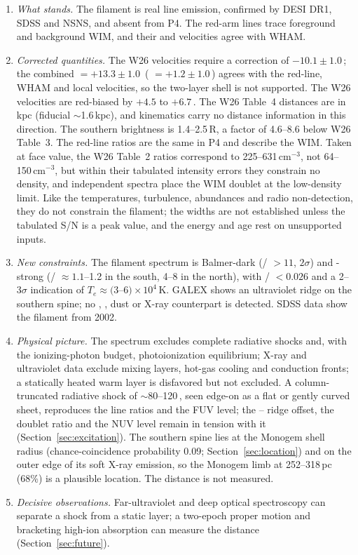 \begin{enumerate}
\item \textit{What stands.} The \Oiii{} filament is real line emission, confirmed by DESI DR1, SDSS and NSNS, and absent from P4. The red-arm lines trace foreground and background WIM, and their \Nii{} and \Sii{} velocities agree with WHAM.

\item \textit{Corrected quantities.} The W26 \Oiii{} velocities require a correction of $-10.1\pm1.0$\,\kms; the combined \vhel{} $=+13.3\pm1.0$\,\kms{} (\vlsr{} $=+1.2\pm1.0$\,\kms) agrees with the red-line, WHAM and local  velocities, so the two-layer shell is not supported. The W26 \Ha{} velocities are red-biased by $+4.5$ to $+6.7$\,\kms. The W26 Table~4 distances are in kpc (fiducial $\sim$1.6\,kpc), and kinematics carry no distance information in this direction. The southern \Oiii{} brightness is 1.4--2.5\,R, a factor of 4.6--8.6 below W26 Table~3. The red-line ratios are the same in P4 and describe the WIM. Taken at face value, the W26 Table~2 \Sii{} ratios correspond to 225--631\,cm$^{-3}$, not 64--150\,cm$^{-3}$, but within their tabulated intensity errors they constrain no density, and independent spectra place the WIM doublet at the low-density limit. Like the temperatures, turbulence, abundances and radio non-detection, they do not constrain the filament; the \Oiii{} widths are not established unless the tabulated S/N is a peak value, and the energy and age rest on unsupported inputs.

\item \textit{New constraints.} The filament spectrum is Balmer-dark (\Oiii/\Hb{} $>11$, $2\sigma$) and \Oii-strong (\Oii/\Oiii{} $\approx1.1$--1.2 in the south, 4--8 in the north), with /\Oiii{} $<0.026$ and a 2--3$\sigma$ indication of $T_e\approx(3$--$6)\times10^{4}$\,K. GALEX shows an ultraviolet ridge on the southern spine; no \Ha, , dust or X-ray counterpart is detected. SDSS data show the filament from 2002.

\item \textit{Physical picture.} The spectrum excludes complete radiative shocks and, with the ionizing-photon budget, photoionization equilibrium; X-ray and ultraviolet data exclude mixing layers, hot-gas cooling and conduction fronts; a statically heated warm layer is disfavored but not excluded. A column-truncated radiative shock of $\sim$80--120\,\kms, seen edge-on as a flat or gently curved sheet, reproduces the line ratios and the FUV level; the \Oii--\Oiii{} ridge offset, the \Oii{} doublet ratio and the NUV level remain in tension with it (Section~\ref{sec:excitation}). The southern spine lies at the Monogem shell radius (chance-coincidence probability 0.09; Section~\ref{sec:location}) and on the outer edge of its soft X-ray emission, so the Monogem limb at 252--318\,pc (68\%) is a plausible location. The distance is not measured.

\item \textit{Decisive observations.} Far-ultraviolet and deep optical spectroscopy can separate a shock from a static layer; a two-epoch proper motion and bracketing high-ion absorption can measure the distance (Section~\ref{sec:future}).
\end{enumerate}
